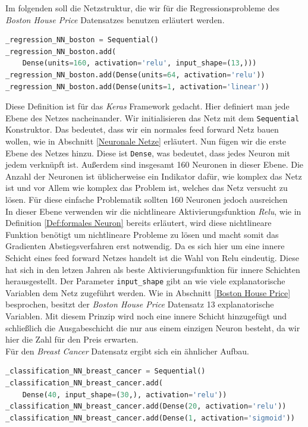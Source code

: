 Im folgenden soll die Netzstruktur, die wir für die Regressionsprobleme
des \textit{Boston House Price} Datensatzes benutzen erläutert werden.

\begin{lstlisting}[language=Python]
_regression_NN_boston = Sequential()
_regression_NN_boston.add(
    Dense(units=160, activation='relu', input_shape=(13,)))
_regression_NN_boston.add(Dense(units=64, activation='relu'))
_regression_NN_boston.add(Dense(units=1, activation='linear'))
\end{lstlisting}

Diese Definition ist für das \textit{Keras} Framework gedacht.
Hier definiert man jede Ebene des Netzes nacheinander. 
Wir initialisieren das Netz mit dem \texttt{Sequential} Konstruktor.
Das bedeutet, dass wir ein normales feed forward Netz bauen wollen,
wie in Abschnitt \ref{Neuronale Netze} erläutert. 
Nun fügen wir die erste Ebene des Netzes hinzu. Diese ist \texttt{Dense}, 
was bedeutet, dass jedes Neuron mit jedem verknüpft ist.
Außerdem sind insgesamt 160 Neuronen in dieser Ebene. 
Die Anzahl der Neuronen ist üblicherweise ein Indikator dafür, wie komplex das 
Netz ist und vor Allem wie komplex das Problem ist, welches das Netz versucht
zu lösen. Für diese einfache Problematik sollten 160 Neuronen jedoch ausreichen
\\

In dieser Ebene verwenden wir die nichtlineare Aktivierungsfunktion \textit{Relu},
wie in Definition \ref{Def:formales Neuron} bereits erläutert, wird diese nichtlineare
Funktion benötigt um nichtlineare Probleme zu lösen und macht somit das 
Gradienten Abstiegsverfahren erst notwendig.
Da es sich hier um eine innere Schicht eines feed forward Netzes handelt ist die
Wahl von Relu eindeutig. Diese hat sich in den letzen Jahren als beste 
Aktivierungsfunktion für innere Schichten herausgestellt. \cite[S. 226]{Goodfellow.2016}
Der Parameter \texttt{input\_shape} gibt an wie viele explanatorische Variablen
dem Netz zugeführt werden. Wie in Abschnitt \ref{Boston House Price} besprochen,
besitzt der \textit{Boston House Price} Datensatz 13 explanatorische Variablen.
Mit diesem Prinzip wird noch eine innere Schicht hinzugefügt und schließlich 
die Ausgabeschicht die nur aus einem einzigen Neuron besteht, da wir hier die
Zahl für den Preis erwarten.\\

Für den \textit{Breast Cancer} Datensatz ergibt sich ein ähnlicher Aufbau.

\begin{lstlisting}[language=Python]
_classification_NN_breast_cancer = Sequential()
_classification_NN_breast_cancer.add(
    Dense(40, input_shape=(30,), activation='relu'))
_classification_NN_breast_cancer.add(Dense(20, activation='relu'))
_classification_NN_breast_cancer.add(Dense(1, activation='sigmoid'))
\end{lstlisting}

